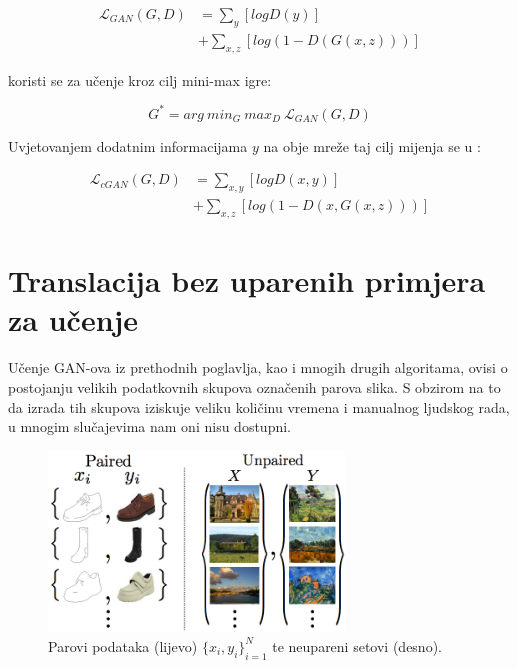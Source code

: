 \documentclass[lmodern, utf8, seminar]{fer}
\newcommand{\Lagr}{\mathcal{L}}
\begin{document}
\begin{equation}
\begin{split}
\Lagr_{GAN}(G, D) &= \sum_{y}[log D(y)] \\
			     &+ \sum_{x,z}[log(1 - D(G(x,z)))]
\end{split}
\end{equation}


koristi se za učenje kroz cilj mini-max igre:

\begin{equation}
G^{*} = arg \: min_G \: max_D \: \Lagr_{GAN}(G, D)
\end{equation}

Uvjetovanjem dodatnim informacijama $y$ na obje mreže taj cilj mijenja se u : 

\begin{equation}
\begin{split}
\Lagr_{cGAN}(G, D) &= \sum_{x,y}[log D(x,y)] \\
			       &+ \sum_{x,z}[log(1 - D(x, G(x,z)))]
\end{split}
\end{equation}



\chapter{Translacija bez uparenih primjera za učenje}
Učenje GAN-ova iz prethodnih poglavlja, kao i mnogih drugih algoritama, ovisi o postojanju velikih podatkovnih skupova označenih parova slika. S obzirom na to da izrada tih skupova iziskuje veliku količinu vremena i manualnog ljudskog rada, u mnogim slučajevima nam oni nisu dostupni.

\begin{figure}[H]
    \centering
    \includegraphics[width=0.7\textwidth]{zhu2017unpaired-paired-vs-unpaired}
    \caption{Parovi podataka (lijevo) ${\{x_i,y_i\}}_{i=1}^N$ te neupareni setovi (desno). }
    \label{fig:zhu2017unpaired-paired-vs-unpaired}
\end{figure}
\end{document}
